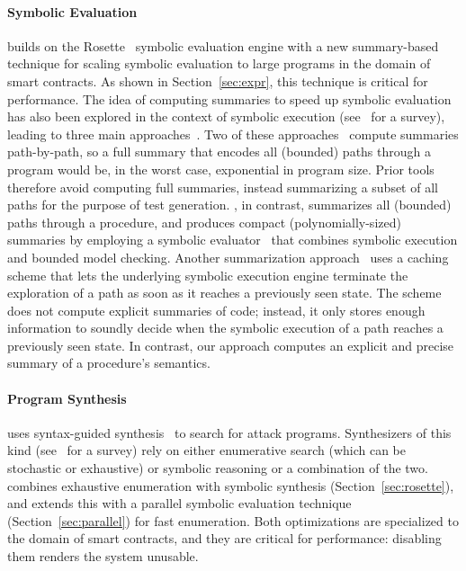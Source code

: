 \paragraph{Symbolic Evaluation}
\toolname builds on the Rosette~\cite{rosette} symbolic evaluation engine with a
new summary-based technique for scaling symbolic evaluation to large programs in
the domain of smart contracts. As shown in Section~\ref{sec:expr}, this
technique is critical for performance. The idea of computing summaries to speed
up symbolic evaluation has also been explored in the context of symbolic
execution (see~\cite{BaldoniCDDF18} for a survey), leading to three main
approaches~\cite{AnandGT08,Godefroid07,BoonstoppelCE08}. Two of these
approaches~\cite{Godefroid07,AnandGT08} compute summaries path-by-path, so a
full summary that encodes all (bounded) paths through a program would be, in the
worst case, exponential in program size. Prior tools therefore avoid computing
full summaries, instead summarizing a subset of all paths for the purpose of
test generation. \toolname, in contrast, summarizes all (bounded) paths through
a procedure, and produces compact (polynomially-sized) summaries by employing 
a symbolic evaluator~\cite{rosette} that combines symbolic execution and bounded model
checking. Another summarization approach~\cite{BoonstoppelCE08} uses a caching scheme
that lets the underlying symbolic execution engine terminate the exploration of a
path as soon as it reaches a previously seen state. The scheme does not compute
explicit summaries of code; instead, it only stores enough information to
soundly decide when the symbolic execution of a path reaches a previously seen
state. In contrast, our approach computes an explicit and precise summary of a
procedure's semantics.  

\paragraph{Program Synthesis} 
\toolname uses syntax-guided synthesis~\cite{sygus} to search for attack
programs. Synthesizers of this kind (see~\cite{synthesis-survey} for a survey)
rely on either enumerative search (which can be stochastic or exhaustive) or
symbolic reasoning or a combination of the two. \toolname combines exhaustive
enumeration with symbolic synthesis (Section~\ref{sec:rosette}), and extends
this with a parallel symbolic evaluation technique (Section~\ref{sec:parallel}) for fast enumeration. Both optimizations are specialized to
the domain of smart contracts, and they are critical for performance: disabling
them renders the system unusable.
